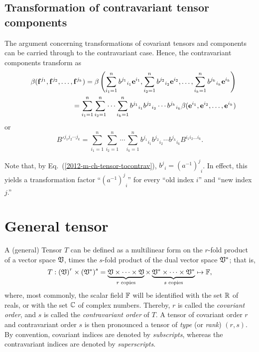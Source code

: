 \subsection{Transformation of contravariant tensor components}

The argument concerning transformations of covariant tensors and components
can be carried through to the contravariant case.
Hence, the contravariant components transform as
\begin{eqnarray}
&&\beta ( {{\bf f}}^{j_1},{{\bf f}}^{j_2},\ldots ,{{\bf f}}^{j_k})=
\beta \left(
\sum_{i_1=1}^n {b^{j_1}}_{i_1} {\bf e}^{i_1},
\sum_{i_2=1}^n {b^{j_2}}_{i_2} {\bf e}^{i_2},
\ldots ,
\sum_{i_k=1}^n {b^{j_k}}_{i_k} {\bf e}^{i_k}
\right)
\nonumber \\&& \quad
=
\sum_{i_1=1}^n\sum_{i_2=1}^n\cdots \sum_{i_k=1}^n
{b^{j_1}}_{i_1}{b^{j_2}}_{i_2}\cdots {b^{j_k}}_{i_k} \beta ( {\bf e}^{i_1},{\bf e}^{i_2},\ldots ,{\bf e}^{i_k})
 \label{2012-m-ch-tensor-etotccon1}
\end{eqnarray}
or
\begin{equation}
B'^{{j_1}{j_2}\cdots {j_k}}=
\sum_{i_1=1}^n\sum_{i_2=1}^n\cdots \sum_{i_k=1}^n
{b^{j_1}}_{i_1}{b^{j_2}}_{i_2}\cdots {b^{j_k}}_{i_k} B^{i_1 i_2\ldots i_k}.
 \label{2012-m-ch-tensor-etotccon2}
\end{equation}

Note that, by Eq.~(\ref{2012-m-ch-tensor-tocontrav}),
$ {b^j}_i =  {\left( a^{-1} \right)^j}_i$.
%
In effect, this yields a transformation factor ``${\left( a^{-1} \right)^j}_i$'' for every ``old index $i$'' and ``new index $j$.''


\section{General tensor}

A (general) Tensor $T$ can be defined as a multilinear form  on the
$r$-fold product of a vector space ${\frak V}$, times the
$s$-fold product of the dual vector space ${\frak V}^\ast$;
that is,
\begin{equation}
T: \left( {\frak V} \right)^r \times \left( {\frak V}^\ast \right)^s
=
\underbrace{{\frak V}\times \cdots \times {\frak V}}_{r\textrm{ \scriptsize copies}}
\times
\underbrace{{\frak V}^\ast \times \cdots \times {\frak V}^\ast}_{s\textrm{ \scriptsize copies}}
\mapsto {\Bbb F}
,
 \label{2012-m-ch-tensor-gdt}
\end{equation}
where, most commonly, the scalar field
${\Bbb F}$
will be identified with the set ${\Bbb R}$ of reals,
or with the set ${\Bbb C}$ of complex numbers.
Thereby,
$r$ is called the
{\em covariant order}, and
$s$ is called the
{\em contravariant order}
of $T$.
A tensor of covariant order $r$ and contravariant order $s$
is then pronounced a tensor of
{\em type} (or {\em rank})
$(r,s)$.
By convention, covariant indices are denoted by {\em subscripts},
whereas the contravariant indices  are denoted by {\em superscripts}.

